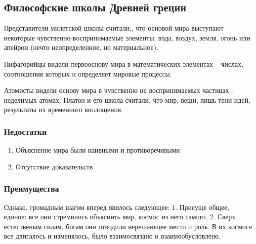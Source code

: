 \documentclass[
]{article}
\providecommand{\tightlist}{%
  \setlength{\itemsep}{0pt}\setlength{\parskip}{0pt}}
\begin{document}
\hypertarget{ux444ux438ux43bux43eux441ux43eux444ux441ux43aux438ux435-ux448ux43aux43eux43bux44b-ux434ux440ux435ux432ux43dux435ux439-ux433ux440ux435ux446ux438ux438}{%
\subsection{Философские школы Древней
греции}\label{ux444ux438ux43bux43eux441ux43eux444ux441ux43aux438ux435-ux448ux43aux43eux43bux44b-ux434ux440ux435ux432ux43dux435ux439-ux433ux440ux435ux446ux438ux438}}

Представители милетской школы считали,, что основой мира выступают
некоторые чувственно-воспринимаемые элементы: вода, воздух, земля, огонь
или апейрон (нечто неопределенное, но материальное).

Пифагорийцы видели первооснову мира в математических элементах --
числах, соотношения которых и определяет мировые процессы.

Атомисты видели основу мира в чувственно не воспринимаемых частицах --
неделимых атомах. Платон и его школа считали, что мир, вещи, лишь тени
идей, результаты их временного воплощения.

\hypertarget{ux43dux435ux434ux43eux441ux442ux430ux442ux43aux438}{%
\subsubsection{Недостатки}\label{ux43dux435ux434ux43eux441ux442ux430ux442ux43aux438}}

\begin{enumerate}
\def\labelenumi{\arabic{enumi}.}
\tightlist
\item
  Объяснение мира были наивными и противоречивыми
\item
  Отсутствие доказательств
\end{enumerate}

\hypertarget{ux43fux440ux435ux438ux43cux443ux449ux435ux441ux442ux432ux430}{%
\subsubsection{Преимущества}\label{ux43fux440ux435ux438ux43cux443ux449ux435ux441ux442ux432ux430}}

Однако, громадным шагом вперед явилось следующее: 1. Присуще общее,
единое: все они стремились объяснить мир, космос из него самого. 2.
Сверх естественым силам, богам они отводили нерешающее место и роль. В
их космосе все двигалось и изменялось, было взаимосвязано и
взаимообусловлено.
\end{document}
